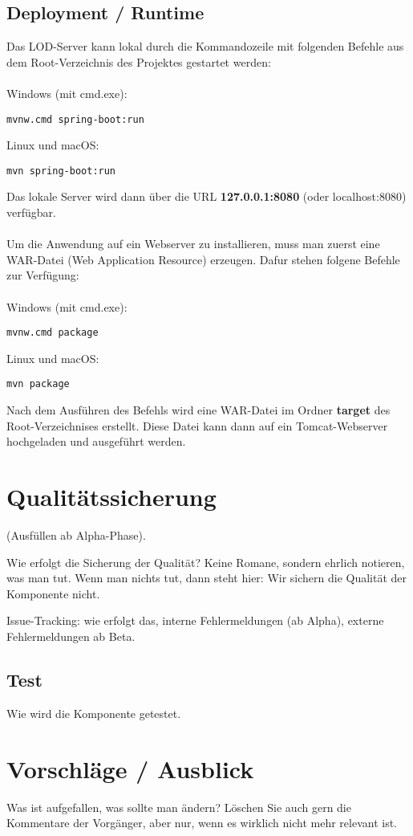 \subsection{Deployment / Runtime}
Das LOD-Server kann lokal durch die Kommandozeile mit folgenden Befehle aus 
dem Root-Verzeichnis des Projektes gestartet werden:\\
\\
Windows (mit cmd.exe):
\begin{lstlisting}
mvnw.cmd spring-boot:run
\end{lstlisting}
Linux und macOS:
\begin{lstlisting}
mvn spring-boot:run
\end{lstlisting}
Das lokale Server wird dann über die URL \textbf{127.0.0.1:8080} 
(oder localhost:8080) verfügbar.\\
\\
Um die Anwendung auf ein Webserver zu installieren, muss man zuerst eine WAR-Datei 
(Web Application Resource) erzeugen. Dafur stehen folgene Befehle zur Verfügung: \\
\\
Windows (mit cmd.exe):
\begin{lstlisting}
mvnw.cmd package
\end{lstlisting}
\vspace{10mm}
\noindent
Linux und macOS:
\begin{lstlisting}
mvn package
\end{lstlisting}
\vspace{5mm}
\noindent
Nach dem Ausführen des Befehls wird eine WAR-Datei im Ordner \textbf{target} 
des Root-Verzeichnises erstellt. Diese Datei kann dann auf ein Tomcat-Webserver
hochgeladen und ausgeführt werden.


\section{Qualitätssicherung}
(Ausfüllen ab Alpha-Phase).

Wie erfolgt die Sicherung der Qualität? Keine Romane, sondern ehrlich notieren,
was man tut. Wenn man nichts tut, dann steht hier: Wir sichern die Qualität der
Komponente nicht.

Issue-Tracking: wie erfolgt das, interne Fehlermeldungen (ab Alpha), 
externe Fehlermeldungen ab Beta.

\subsection{Test}
Wie wird die Komponente getestet.

\section{Vorschläge / Ausblick}
Was ist aufgefallen, was sollte man ändern? Löschen Sie auch gern die Kommentare
der Vorgänger, aber nur, wenn es wirklich nicht mehr relevant ist.

